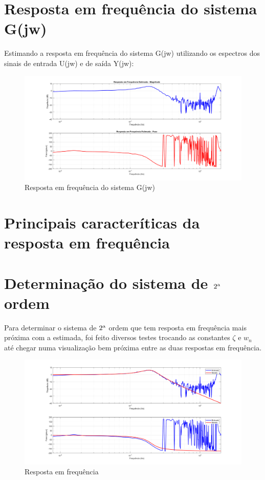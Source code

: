 \documentclass[10pt]{article}
\begin{document}
\section{Resposta em frequência do sistema G(jw)}

\quad Estimando a resposta em frequência do sistema G(jw) utilizando os espectros dos sinais
de entrada U(jw) e de saída Y(jw):

\begin{figure}[h]
    \centering
    \includegraphics[scale=0.34]{g.png}
    \caption{Resposta em frequência do sistema G(jw)}
\end{figure}

\section{Principais caracteríticas da resposta em frequência}

\newpage

\section{Determinação do sistema de $2\textsuperscript{a}$ ordem}

\quad Para determinar o sistema de $2\textsuperscript{a}$ ordem que tem resposta em frequência mais próxima com a estimada,
foi feito diversos testes trocando as constantes $\zeta$ e $w_n$
até chegar numa visualização bem próxima entre as duas respostas em frequência.

\begin{figure}[h]
    \centering
    \includegraphics[scale=0.35]{g_manual.png}
    \caption{Resposta em frequência}
\end{figure}
\end{document}
